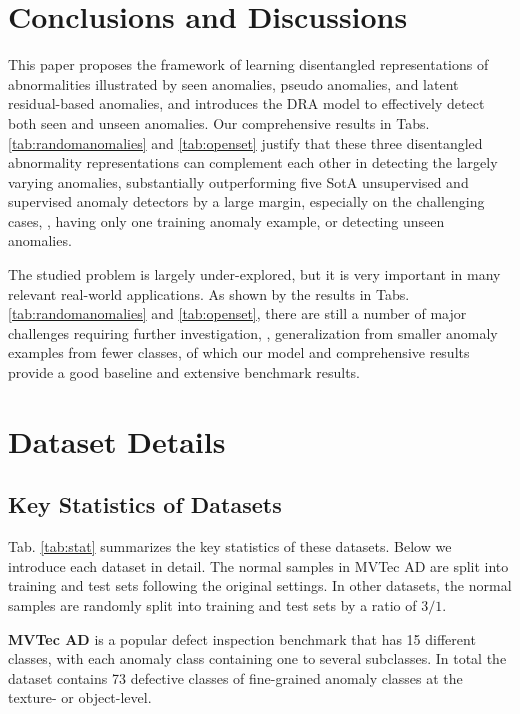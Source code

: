 \documentclass[10pt,twocolumn,letterpaper]{article}
\begin{document}
\section{Conclusions and Discussions}

This paper proposes the framework of learning disentangled representations of abnormalities illustrated by seen anomalies, pseudo anomalies, and latent residual-based anomalies, and introduces the DRA model to effectively detect both seen and unseen anomalies. Our comprehensive results in Tabs. \ref{tab:randomanomalies} and \ref{tab:openset} justify that these three disentangled abnormality representations can complement each other in detecting the largely varying anomalies, substantially outperforming five SotA unsupervised and supervised anomaly detectors by a large margin, especially on the challenging cases, \eg, having only one training anomaly example, or detecting unseen anomalies. 
 
 The studied problem is largely under-explored, but it is very important in many relevant real-world applications. As shown by the results in Tabs. \ref{tab:randomanomalies} and \ref{tab:openset}, there are still a number of major challenges requiring further investigation, \eg, generalization from smaller anomaly examples from fewer classes, of which our model and comprehensive results provide a good baseline and extensive benchmark results.

{\small


}
\clearpage


\appendix
\section{Dataset Details}\label{app:dataset}

\subsection{Key Statistics of Datasets}
Tab. \ref{tab:stat} summarizes the key statistics of these datasets. Below we introduce each dataset in detail. The normal samples in MVTec AD are split into training and test sets following the original settings. In other datasets, the normal samples are randomly split into training and test sets by a ratio of $3/1$.

\textbf{MVTec AD} \cite{Bergmann_2019_CVPR} is a popular defect inspection benchmark that has 15 different classes, with each anomaly class containing one to several subclasses. In total the dataset contains 73 defective classes of fine-grained anomaly classes at the texture- or object-level.
\end{document}
